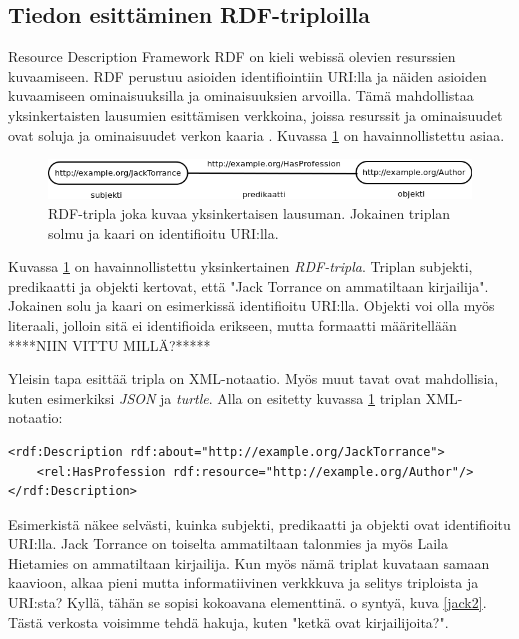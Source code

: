 \documentclass[finnish]{tktltiki2}
\theoremstyle{definition}
\theoremstyle{remark}
\begin{document}
\subsection{Tiedon esittäminen RDF-triploilla}

Resource Description Framework RDF on kieli webissä olevien resurssien
kuvaamiseen. 
RDF perustuu asioiden identifiointiin URI:lla ja näiden asioiden kuvaamiseen 
ominaisuuksilla ja ominaisuuksien arvoilla. Tämä mahdollistaa yksinkertaisten
lausumien 
esittämisen verkkoina, joissa resurssit ja ominaisuudet ovat soluja ja
ominaisuudet verkon 
kaaria \cite{RDFP}. Kuvassa \ref{jack} on havainnollistettu asiaa. 

\begin{figure}[h]
 \centering
 \includegraphics[scale=0.50]{JackTorrance.png}
 \caption{RDF-tripla joka kuvaa yksinkertaisen lausuman. Jokainen triplan solmu
ja kaari on identifioitu URI:lla. }
 \label{jack}
\end{figure}

Kuvassa \ref{jack} on havainnollistettu yksinkertainen \textit{RDF-tripla}.
Triplan 
subjekti, predikaatti ja objekti kertovat, että "Jack Torrance on ammatiltaan
kirjailija".
Jokainen solu ja kaari on esimerkissä identifioitu URI:lla. Objekti voi olla
myös literaali, jolloin 
sitä ei identifioida erikseen, mutta formaatti määritellään ****NIIN VITTU
MILLÄ?*****

Yleisin tapa esittää tripla on XML-notaatio. Myös muut tavat ovat mahdollisia,
kuten 
esimerkiksi \textit{JSON} ja \textit{turtle}. Alla on esitetty kuvassa
\ref{jack} triplan XML-notaatio:
\begin{verbatim}
<rdf:Description rdf:about="http://example.org/JackTorrance">
    <rel:HasProfession rdf:resource="http://example.org/Author"/>
</rdf:Description>
\end{verbatim}

Esimerkistä näkee selvästi, kuinka subjekti, predikaatti ja objekti ovat
identifioitu
URI:lla. Jack Torrance on toiselta ammatiltaan talonmies ja myös Laila Hietamies
on 
ammatiltaan kirjailija. Kun myös nämä triplat kuvataan samaan kaavioon, alkaa
pieni 
mutta informatiivinen verkkkuva ja selitys triploista ja URI:sta? Kyllä, tähän se sopisi kokoavana
elementtinä.
o syntyä, kuva \ref{jack2}. Tästä verkosta voisimme
tehdä hakuja, kuten 
"ketkä ovat kirjailijoita?".
\end{document}
